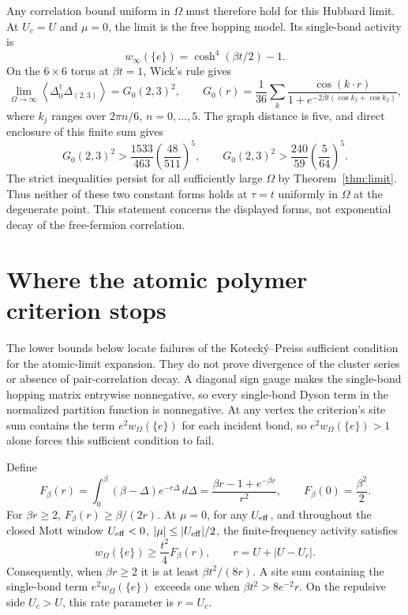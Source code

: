 \documentclass[11pt]{article}
\newcommand{\Deltaop}{\Delta}
\begin{document}
Any correlation bound uniform in $\Omega$ must therefore hold for this Hubbard limit. At $U_c=U$ and $\mu=0$, the limit is the free hopping model. Its single-bond activity is
\[
 w_\infty(\{e\})=\cosh^4(\beta t/2)-1.
\]
On the $6\times6$ torus at $\beta t=1$, Wick's rule gives
\[
 \lim_{\Omega\to\infty}
 \left\langle\Deltaop_0^\dagger\Deltaop_{(2,3)}\right\rangle
 =G_0(2,3)^2,
 \qquad
 G_0(r)=\frac1{36}\sum_k
 \frac{\cos(k\cdot r)}{1+e^{-2\beta t(\cos k_1+\cos k_2)}},
\]
where $k_j$ ranges over $2\pi n/6$, $n=0,\ldots,5$. The graph distance is five, and direct enclosure of this finite sum gives
\[
 G_0(2,3)^2>
 \frac{1533}{463}\left(\frac{48}{511}\right)^5,
 \qquad
 G_0(2,3)^2>
 \frac{240}{59}\left(\frac5{64}\right)^5.
\]
The strict inequalities persist for all sufficiently large $\Omega$ by Theorem~\ref{thm:limit}. Thus neither of these two constant forms holds at $\tau=t$ uniformly in $\Omega$ at the degenerate point. This statement concerns the displayed forms, not exponential decay of the free-fermion correlation.

\section{Where the atomic polymer criterion stops}

The lower bounds below locate failures of the Kotecký–Preiss sufficient condition \cite{kp} for the atomic-limit expansion. They do not prove divergence of the cluster series or absence of pair-correlation decay. A diagonal sign gauge makes the single-bond hopping matrix entrywise nonnegative, so every single-bond Dyson term in the normalized partition function is nonnegative. At any vertex the criterion's site sum contains the term $e^2w_\Omega(\{e\})$ for each incident bond, so $e^2w_\Omega(\{e\})>1$ alone forces this sufficient condition to fail.

Define
\[
 F_\beta(r)=\int_0^\beta(\beta-\Delta)e^{-r\Delta}\,d\Delta
 =\frac{\beta r-1+e^{-\beta r}}{r^2},
 \qquad F_\beta(0)=\frac{\beta^2}{2}.
\]
For $\beta r\ge2$, $F_\beta(r)\ge\beta/(2r)$. At $\mu=0$, for any $U_{\rm eff}$, and throughout the closed Mott window $U_{\rm eff}<0$, $|\mu|\le|U_{\rm eff}|/2$, the finite-frequency activity satisfies
\[
 w_\Omega(\{e\})\ge\frac{t^2}{4}F_\beta(r),
 \qquad r=U+|U-U_c|.
\]
Consequently, when $\beta r\ge2$ it is at least $\beta t^2/(8r)$. A site sum containing the single-bond term $e^2w_\Omega(\{e\})$ exceeds one when $\beta t^2>8e^{-2}r$. On the repulsive side $U_c>U$, this rate parameter is $r=U_c$.
\end{document}
